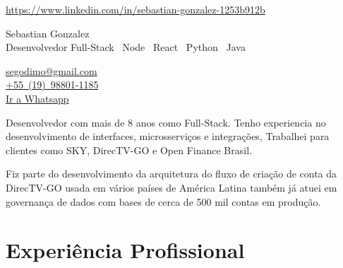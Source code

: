 \documentclass[a4paper,10pt]{article}
\makeatletter
\newcommand{\linkedin}{https://www.linkedin.com/in/sebastian-gonzalez-1253b912b}
\newcommand{\mobile}{https://wa.me/5519988011185}
\newcommand{\email}{segodimo@gmail.com}
\makeatother
\begin{document}
\noindent %


\hfill\textcolor{corSection}{\href{\linkedin}{\linkedin}} 
\begin{minipage}[t]{0.7\textwidth}
  \raggedright %
  \vspace{6mm} %
  \Huge{\textcolor{corHuge}{Sebastian Gonzalez}} \\
  \vspace{2mm} %
  \large{\textcolor{corLarge}{Desenvolvedor Full-Stack}} \textbar\ 
  \large{\textcolor{corLarge}{Node}} \textbar\
  \large{\textcolor{corLarge}{React}} \textbar\
  \large{\textcolor{corLarge}{Python}} \textbar\
  \large{\textcolor{corLarge}{Java}}
\end{minipage}%
\begin{minipage}[t]{0.3\textwidth}
  \raggedleft %
  \setlength{\parskip}{0pt} %
  \textcolor{corSection}{\href{mailto:\email}{\email}}  \\
  \textcolor{corSection}{\href{\mobile}{+55~(19)~98801-1185}} \\
  \textcolor{corSection}{\href{\mobile}{Ir a Whatsapp}} 

\end{minipage}

\vspace{5mm}

Desenvolvedor com mais de 8 anos como Full-Stack.
Tenho experiencia no desenvolvimento de interfaces, microsserviços e integrações,
Trabalhei para clientes como SKY, DirecTV-GO
e Open Finance Brasil.

Fiz parte do desenvolvimento da arquitetura do fluxo de criação de conta da DirecTV-GO
usada em vários países de América Latina
também já atuei em governança de dados com bases de cerca de 500 mil contas em produção.

\section*{Experiência Profissional}
\noindent\makebox[\linewidth]{\rule{\linewidth}{0.1mm}\textcolor{corLarge}{}}
\end{document}
